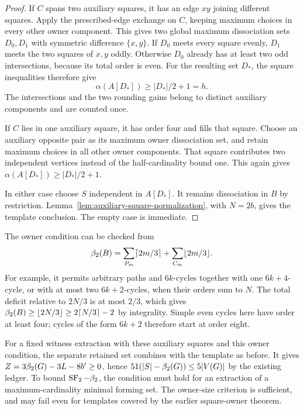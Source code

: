 \begin{proof}
If $C$ spans two auxiliary squares, it has an edge $xy$ joining different
squares. Apply the prescribed-edge exchange on $C$, keeping maximum choices
in every other owner component. This gives two global maximum dissociation
sets $D_0,D_1$ with symmetric difference $\{x,y\}$.
If $D_0$ meets every square evenly, $D_1$ meets the two squares of $x,y$
oddly. Otherwise $D_0$ already has at least two odd intersections, because
its total order is even. For the resulting set $D_*$, the square inequalities
therefore give
\[
 \alpha(A[D_*])\ge |D_*|/2+1=h.
\]
The intersections and the two rounding gains belong to distinct auxiliary
components and are counted once.

If $C$ lies in one auxiliary square, it has order four and fills that square.
Choose an auxiliary opposite pair as its maximum owner dissociation set,
and retain maximum choices in all other owner components. That square
contributes two independent vertices instead of the half-cardinality bound
one. This again gives $\alpha(A[D_*])\ge|D_*|/2+1$.

In either case choose $S$ independent in $A[D_*]$. It remains dissociation
in $B$ by restriction. Lemma~\ref{lem:auxiliary-square-normalization}, with
$N=2b$, gives the template conclusion. The empty case is immediate.
\end{proof}

The owner condition can be checked from
\[
 \beta_2(B)=\sum_{P_m}\lceil2m/3\rceil+
                  \sum_{C_m}\lfloor2m/3\rfloor.
\]
For example, it permits arbitrary paths and $6k$-cycles together with one
$6k+4$-cycle, or with at most two $6k+2$-cycles, when their orders sum to $N$.
The total deficit relative to $2N/3$ is at most $2/3$, which gives
$\beta_2(B)\ge\lfloor2N/3\rfloor\ge2\lceil N/3\rceil-2$ by integrality. Simple even cycles here have order at least four; cycles of the
form $6k+2$ therefore start at order eight.

For a fixed witness extraction with these auxiliary squares and this owner
condition, the separate retained set combines with the template as before.
It gives $Z=3\beta_2(G)-3L-8b'\ge0$, hence $51(|S|-\beta_2(G))\le5|V(G)|$ by
the existing ledger. To bound $\operatorname{SF}_2-\beta_2$, the condition must hold for an
extraction of a maximum-cardinality minimal forming set.
The owner-size criterion is sufficient, and may fail even for templates
covered by the earlier square-owner theorem.
